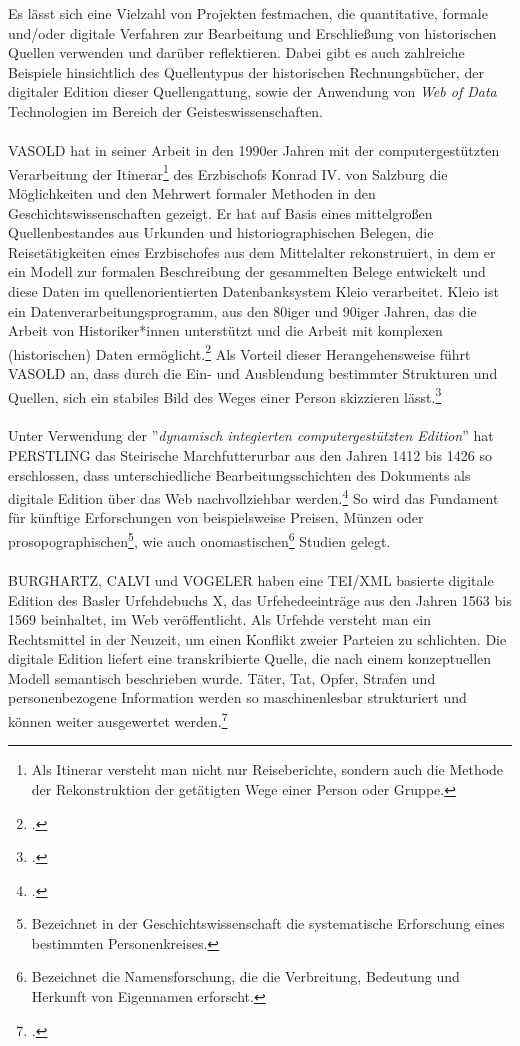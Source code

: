 \documentclass[12pt,a4paper]{article}
\begin{document}
Es lässt sich eine Vielzahl von Projekten festmachen, die quantitative, formale und/oder digitale Verfahren zur Bearbeitung und Erschließung von historischen Quellen verwenden und darüber reflektieren. Dabei gibt es auch zahlreiche Beispiele hinsichtlich des Quellentypus der historischen Rechnungsbücher, der digitaler Edition dieser Quellengattung, sowie der Anwendung von \textit{Web of Data} Technologien im Bereich der Geisteswissenschaften.
\\
\\
VASOLD hat in seiner Arbeit in den 1990er Jahren mit der computergestützten Verarbeitung der Itinerar\footnote{Als Itinerar versteht man nicht nur Reiseberichte, sondern auch die Methode der Rekonstruktion der getätigten Wege einer Person oder Gruppe.} des Erzbischofs Konrad IV. von Salzburg die Möglichkeiten und den Mehrwert formaler Methoden in den Geschichtswissenschaften gezeigt. Er hat auf Basis eines mittelgroßen Quellenbestandes aus Urkunden und historiographischen Belegen, die Reisetätigkeiten eines Erzbischofes aus dem Mittelalter rekonstruiert, in dem er ein Modell zur formalen Beschreibung der gesammelten Belege entwickelt und diese Daten im quellenorientierten Datenbanksystem Kleio verarbeitet. Kleio ist ein Datenverarbeitungsprogramm, aus den 80iger und 90iger Jahren, das die Arbeit von Historiker*innen unterstützt und die Arbeit mit komplexen (historischen) Daten ermöglicht.\footcite[][S.172-174]{hoffmann1990ehepaare}  Als Vorteil dieser Herangehensweise führt VASOLD an, dass durch die Ein- und Ausblendung bestimmter Strukturen und Quellen, sich ein stabiles Bild des Weges einer Person skizzieren lässt.\footcite{vasold1996itinerar}
\\
\\
Unter Verwendung der ''\textit{dynamisch integierten computergestützten Edition}'' hat PERSTLING das Steirische Marchfutterurbar aus den Jahren 1412 bis 1426 so erschlossen, dass unterschiedliche Bearbeitungsschichten des Dokuments als digitale Edition über das Web nachvollziehbar werden.\footcite{PerstlingMatthias2013MDuE} So wird das Fundament für künftige  Erforschungen von beispielsweise Preisen, Münzen oder prosopographischen\footnote{Bezeichnet in der Geschichtswissenschaft die systematische Erforschung eines bestimmten Personenkreises.}, wie  auch onomastischen\footnote{Bezeichnet die Namensforschung, die die Verbreitung, Bedeutung und Herkunft von Eigennamen erforscht.} Studien gelegt.
\\
\\
BURGHARTZ, CALVI und VOGELER haben eine TEI/XML basierte digitale Edition des Basler Urfehdebuchs X, das Urfehedeeinträge aus den Jahren 1563 bis 1569 beinhaltet, im Web veröffentlicht. Als Urfehde versteht man ein Rechtsmittel in der Neuzeit, um einen Konflikt zweier Parteien zu schlichten. Die digitale Edition liefert eine transkribierte Quelle, die nach einem konzeptuellen Modell semantisch beschrieben wurde. Täter, Tat, Opfer, Strafen und personenbezogene Information werden so maschinenlesbar strukturiert und können weiter ausgewertet werden.\footcite[][S.27-29]{pollin2017semantically} 
\end{document}
